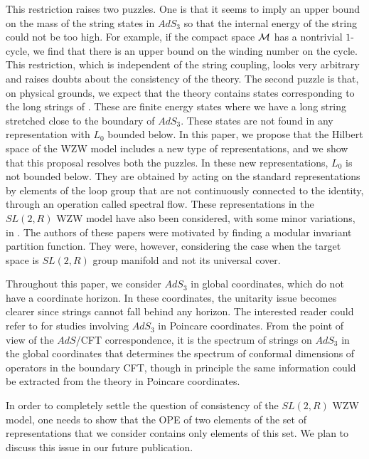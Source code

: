 This restriction raises two puzzles. One is that it seems to imply an
upper bound on the mass of the string states in $AdS_3$ so that
the internal energy of the string could not be too high. For example,
if the compact space ${\cal M}$ has a nontrivial $1$-cycle, we find
that there is an upper bound on the winding number on the cycle.  
This restriction, which is independent of the string 
coupling, looks very arbitrary and raises doubts about the consistency 
of the theory. 
The second puzzle is that, on physical grounds, we expect that
the theory contains states corresponding
to the long strings of \cite{Maldacena:1998uz,Seiberg:1999xz}.
These are finite energy states where we have a long string stretched 
close to the boundary of $AdS_3$.   
These states are not found in any representation 
with $L_0$ bounded below. 
In this paper, we propose that the Hilbert space of the WZW model
includes a new type of representations, and we show that this
proposal resolves both the puzzles. In these new representations, 
$L_0$ is not bounded below. They are obtained by acting on
the standard representations by elements of the loop group that
are not continuously connected to the identity, through an operation
called spectral flow. 
These representations in the $SL(2,R)$ WZW model
have also been considered, with some minor variations, in 
\cite{Henningson:1991jc,Hwang:1992uk}. The authors of these
papers were motivated by finding a modular invariant partition 
function. They were, however, considering the case when the target
space is $SL(2,R)$ group manifold and not its universal cover. 

Throughout this paper, we consider $AdS_3$ in  global coordinates, which
do not have a coordinate horizon. In these coordinates,
the unitarity issue becomes clearer since strings cannot fall behind
any horizon. 
The interested reader could refer to 
\cite{Bars:1995cn,Bars:1996mf,Bars:1999ik} for studies 
involving $AdS_3$ in Poincare coordinates.
{}From the point of view of the $AdS$/CFT correspondence, it 
is the  spectrum of strings on $AdS_3$ in the global coordinates that
determines
the spectrum of conformal dimensions of operators in the boundary 
CFT, though in principle the same information could be extracted from 
the theory in Poincare coordinates. 

In order to completely settle the question of consistency of the 
$SL(2,R)$ WZW model, one needs to show that the OPE of two elements of
the set of representations
that we consider contains only elements of this set. We plan to
discuss this issue in our future publication.


